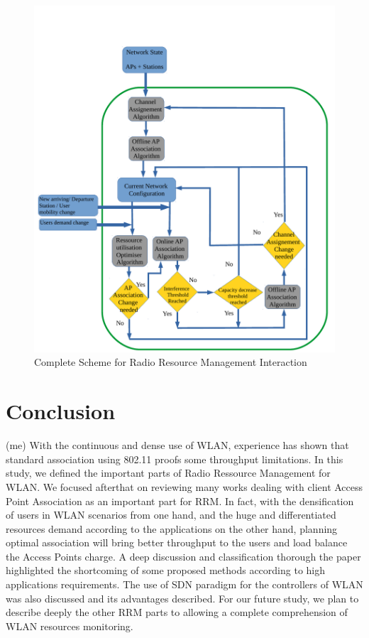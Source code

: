 \documentclass[journal,transmag]{IEEEtran}
\begin{document}
\begin{figure}[t]
\centering
\includegraphics[width=9.cm]{Figures/diagramme_controler_functioning.pdf}
\caption{Complete Scheme for Radio Resource Management Interaction}
\label{fig:complete_RRM_scheme}
\end{figure}


\section{Conclusion} (me)
\label{Conclusion}
With the continuous and dense use of WLAN, experience has shown that standard association using 802.11 proofs some throughput limitations. In this study, we defined the important parts of Radio Ressource Management for WLAN. We focused afterthat on reviewing many works dealing with client Access Point Association as an important part for RRM. In fact, with the densification of users in WLAN scenarios from one hand, and the huge and differentiated resources demand according to the applications on the other hand, planning optimal association will bring better throughput to the users and load balance the Access Points charge. A deep discussion and classification thorough the paper highlighted the shortcoming of some proposed methods according to high applications requirements. The use of SDN paradigm for the controllers of WLAN was also discussed and its advantages described. For our future study, we plan to describe deeply the other RRM parts to allowing a complete comprehension of WLAN resources monitoring.      





\end{document}
